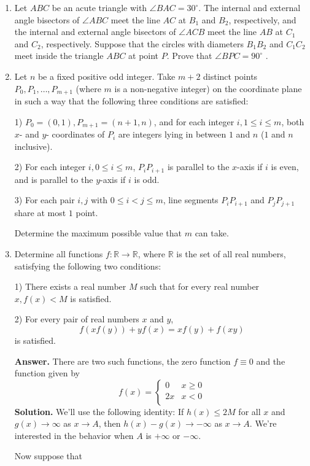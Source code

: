 \documentclass[11pt,a4paper]{article}
\begin{document}
\begin{enumerate}
	\item Let $ABC$ be an acute triangle with $\angle BAC=30^{\circ}$. The internal and external angle bisectors of $\angle ABC$ meet the line $AC$ at $B_1$ and $B_2$, respectively, and the internal and external angle bisectors of $\angle ACB$ meet the line $AB$ at $C_1$ and $C_2$, respectively. Suppose that the circles with diameters $B_1B_2$ and $C_1C_2$ meet inside the triangle $ABC$ at point $P$. Prove that $\angle BPC=90^{\circ}$ .
	
	\item 
	Let $n$ be a fixed positive odd integer. Take $m+2$ distinct points $P_0,P_1,\ldots ,P_{m+1}$ (where $m$ is a non-negative integer) on the coordinate plane in such a way that the following three conditions are satisfied:
	
	1) $P_0=(0,1),P_{m+1}=(n+1,n)$, and for each integer $i,1\le i\le m$, both $x$- and $y$- coordinates of $P_i$ are integers lying in between $1$ and $n$ ($1$ and $n$ inclusive).
	
	2) For each integer $i,0\le i\le m$, $P_iP_{i+1}$ is parallel to the $x$-axis if $i$ is even, and is parallel to the $y$-axis if $i$ is odd.
	
	3) For each pair $i,j$ with $0\le i<j\le m$, line segments $P_iP_{i+1}$ and $P_jP_{j+1}$ share at most $1$ point.
	
	Determine the maximum possible value that $m$ can take.
	
	\item 
	Determine all functions $f:\mathbb{R}\to\mathbb{R}$, where $\mathbb{R}$ is the set of all real numbers, satisfying the following two conditions:
	
	1) There exists a real number $M$ such that for every real number $x,f(x)<M$ is satisfied.
	
	2) For every pair of real numbers $x$ and $y$,
	\[ f(xf(y))+yf(x)=xf(y)+f(xy)\]
	is satisfied.
	
	\textbf{Answer.} There are two such functions, the zero function $f\equiv 0$ and the function given by
	\[
	f(x)=\begin{cases}
		0 & x\ge 0\\
		2x & x < 0\\
	\end{cases}
	\]
	\textbf{Solution.} We'll use the following identity: If $h(x)\le 2M$ for all $x$ and $g(x)\to \infty$ as $x\to A$, then $h(x)-g(x)\to -\infty$ as $x\to A$. We're interested in the behavior when $A$ is $+\infty$ or $-\infty$. 
	
	Now suppose that 	
\end{enumerate}
\end{document}
